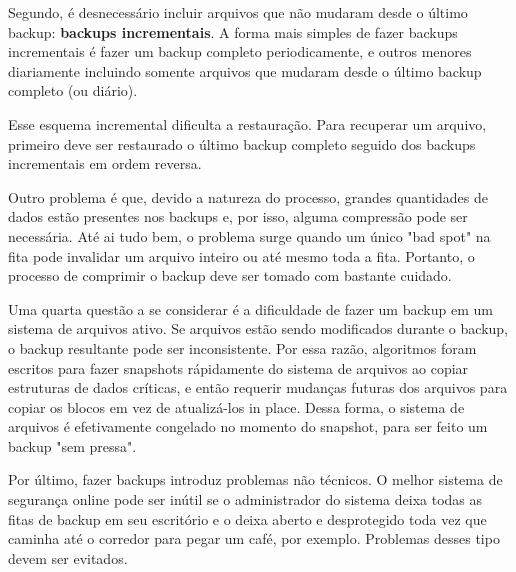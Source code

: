 \documentclass{article}
\begin{document}
Segundo, é desnecessário incluir arquivos que não mudaram desde o último backup: \textbf{backups incrementais}. A forma mais simples de fazer backups incrementais é fazer um backup completo periodicamente, e outros menores diariamente incluindo somente arquivos que mudaram desde o último backup completo (ou diário).

Esse esquema incremental dificulta a restauração. Para recuperar um arquivo, primeiro deve ser restaurado o último backup completo seguido dos backups incrementais em ordem reversa.

Outro problema é que, devido a natureza do processo, grandes quantidades de dados estão presentes nos backups e, por isso, alguma compressão pode ser necessária. Até ai tudo bem, o problema surge quando um único "bad spot" na fita pode invalidar um arquivo inteiro ou até mesmo toda a fita. Portanto, o processo de comprimir o backup deve ser tomado com bastante cuidado.

Uma quarta questão a se considerar é a dificuldade de fazer um backup em um sistema de arquivos ativo. Se arquivos estão sendo modificados durante o backup, o backup resultante pode ser inconsistente. Por essa razão, algoritmos foram escritos para fazer snapshots rápidamente do sistema de arquivos ao copiar estruturas de dados críticas, e então requerir mudanças futuras dos arquivos para copiar os blocos em vez de atualizá-los in place. Dessa forma, o sistema de arquivos é efetivamente congelado no momento do snapshot, para ser feito um backup "sem pressa".

Por último, fazer backups introduz problemas não técnicos. O melhor sistema de segurança online pode ser inútil se o administrador do sistema deixa todas as fitas de backup em seu escritório e o deixa aberto e desprotegido toda vez que caminha até o corredor para pegar um café, por exemplo. Problemas desses tipo devem ser evitados. 
\end{document}
